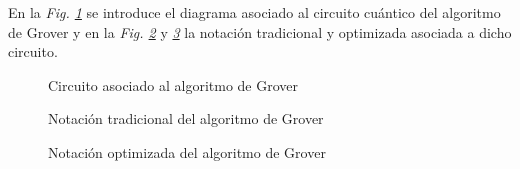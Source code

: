 \documentclass[10pt,conference,a4paper]{IEEEtran}
\begin{document}
En la \textit{Fig. \ref{fig:grover}} se introduce el diagrama asociado al circuito cuántico del algoritmo de Grover y en la \textit{Fig. \ref{not:grover-trad}} y \textit{\ref{not:grover}} la notación tradicional y optimizada asociada a dicho circuito.

\begin{figure}[htb!]
\begin{center}
    \caption{Circuito asociado al algoritmo de Grover} \label{fig:grover}
\end{center}
\end{figure}

\begin{figure}[htb!]
\centering
{}
\caption{Notación tradicional del algoritmo de Grover}
\label{not:grover-trad}
\end{figure}

\begin{figure}[htb!]
\centering
{}
\caption{Notación optimizada del algoritmo de Grover}
\label{not:grover}
\end{figure}
\end{document}

